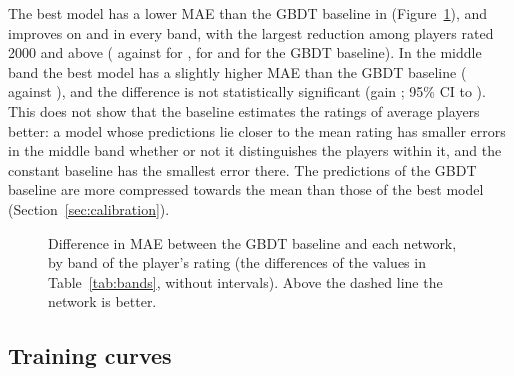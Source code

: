 \documentclass[11pt]{article}
\begin{document}
\begin{table}[htbp]\centering\small
{}
\caption{Test MAE by band of the player's rating. The bands are defined by
the target, so values are comparable within a column and not between
columns.}
\label{tab:bands}
\end{table}

The best model has a lower MAE than the GBDT baseline in
 (Figure~\ref{fig:bands}), and improves on
 and  in every band, with the largest
reduction among players rated 2000 and above ( against
 for ,  for
 and  for the GBDT baseline). In the
middle band  the best model has a slightly higher
MAE than the GBDT baseline ( against )\iflook,
and the difference is not statistically significant (gain
; 95\% CI  to
)\fi. This does not show that the baseline
estimates the ratings of average players better: a model whose predictions
lie closer to the mean rating has smaller errors in the middle band whether
or not it distinguishes the players within it, and the constant baseline has
the smallest error there.\iflook{} The predictions of the GBDT baseline are
more compressed towards the mean than those of the best model
(Section~\ref{sec:calibration}).\fi

\begin{figure}[htbp]\centering
{}
\caption{Difference in MAE between the GBDT baseline and each network, by
band of the player's rating (the differences of the values in
Table~\ref{tab:bands}, without intervals). Above the dashed line the network
is better.}
\label{fig:bands}
\end{figure}

\subsection{Training curves}
\label{sec:curves}
\end{document}
